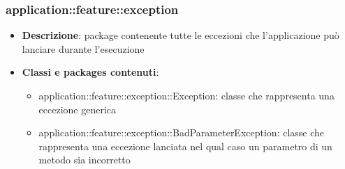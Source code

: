 \subsubsection{application::feature::exception}
\begin{itemize}
	\item \textbf{Descrizione}: package contenente tutte le eccezioni che l'applicazione può lanciare durante l'esecuzione
	\item \textbf{Classi e packages contenuti}:
	\begin{itemize}
	\item application::feature::exception::Exception: classe che rappresenta una eccezione generica
	\item application::feature::exception::BadParameterException: classe che rappresenta una eccezione lanciata nel qual caso un parametro di un metodo sia incorretto
	\end{itemize}
\end{itemize}
